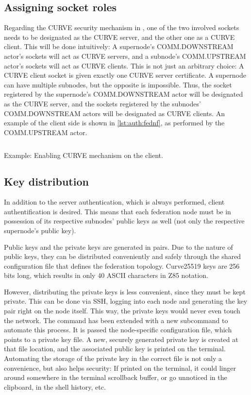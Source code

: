 \subsection{Assigning socket roles}
Regarding the CURVE security mechanism in \zmq, one of the two involved sockets
needs to be designated as the CURVE server, and the other one as a CURVE
client. This will be done intuitively: A supernode's
COMM.DOWNSTREAM actor's sockets will act as CURVE servers, and a subnode's
COMM.UPSTREAM actor's sockets will act as CURVE clients. This is not just an
arbitrary choice: A CURVE client socket is given exactly one CURVE server
certificate. A supernode can have multiple subnodes, but the opposite is
impossible. Thus, the socket registered by the supernode's
COMM.DOWNSTREAM actor will be designated as the CURVE server, and the sockets
registered by the subnodes' COMM.DOWNSTREAM actors will be designated as CURVE
clients. An example of the client side is shown in \autoref{lst:auth:fednf}, as
performed by the COMM.UPSTREAM actor.

\begin{listing}
	\inputminted[bgcolor=bg]{Ruby}{listings/auth/fednf.rb}
	\caption{Example: Enabling CURVE mechanism on the client.}
	\label{lst:auth:fednf}
\end{listing}

\subsection{Key distribution}
In addition to the server authentication, which is always performed, client
authentification is desired. This means that each federation node must be
in possession of its respective subnodes' public keys as well (not only the
respective supernode's public key).

Public keys and the private keys are generated in pairs.  Due to
the nature of public keys, they can be distributed conveniently and safely
through the shared configuration file that defines the federation
topology. Curve25519 keys are 256 bits long, which results in only 40 ASCII
characters in \gls{Z85} notation.

However, distributing the private keys is less convenient, since they must be kept
private. This can be done via \gls{SSH}, logging into each node and generating
the key pair right on the node itself. This way, the private keys would never
even touch the network. The  command has been extended with a new
subcommand  to automate this process. It is passed the node-specific
configuration file, which points to a private key file. A new, securely
generated private key is created at that file location, and the associated
public key is printed on the terminal. Automating the storage of the private
key in the correct file is not only a convenience, but also helps security: If
printed on the terminal, it could linger around somewhere in the terminal
scrollback buffer, or go unnoticed in the clipboard, in the shell history, etc.

